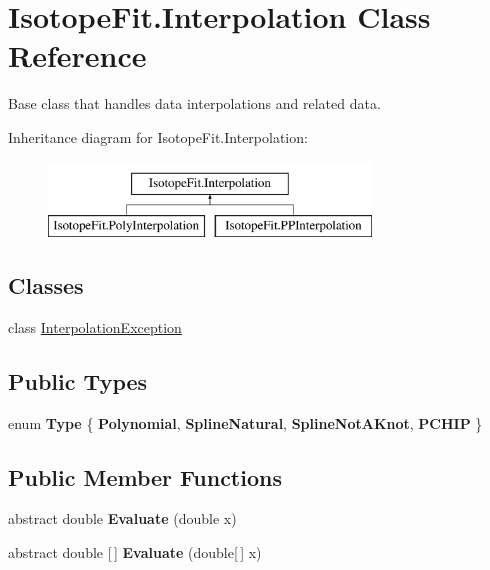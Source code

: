 \hypertarget{class_isotope_fit_1_1_interpolation}{}\section{Isotope\+Fit.\+Interpolation Class Reference}
\label{class_isotope_fit_1_1_interpolation}


Base class that handles data interpolations and related data.  


Inheritance diagram for Isotope\+Fit.\+Interpolation\+:\begin{figure}[H]
\begin{center}
\leavevmode
\includegraphics[height=2.000000cm]{class_isotope_fit_1_1_interpolation}
\end{center}
\end{figure}
\subsection*{Classes}
\begin{DoxyCompactItemize}
\item 
class \mbox{\hyperlink{class_isotope_fit_1_1_interpolation_1_1_interpolation_exception}{Interpolation\+Exception}}
\end{DoxyCompactItemize}
\subsection*{Public Types}
\begin{DoxyCompactItemize}
\item 
\mbox{\label{class_isotope_fit_1_1_interpolation_af374d540896ff406c38322a30a4477b4}} 
enum {\bfseries Type} \{ {\bfseries Polynomial}, 
{\bfseries Spline\+Natural}, 
{\bfseries Spline\+Not\+A\+Knot}, 
{\bfseries P\+C\+H\+IP}
 \}
\end{DoxyCompactItemize}
\subsection*{Public Member Functions}
\begin{DoxyCompactItemize}
\item 
\mbox{\label{class_isotope_fit_1_1_interpolation_ac9c7f5985c6f956e03db0b0de233d514}} 
abstract double {\bfseries Evaluate} (double x)
\item 
\mbox{\label{class_isotope_fit_1_1_interpolation_afe9c495f3e3eae57b1019428f7f70192}} 
abstract double \mbox{[}$\,$\mbox{]} {\bfseries Evaluate} (double\mbox{[}$\,$\mbox{]} x)
\end{DoxyCompactItemize}
